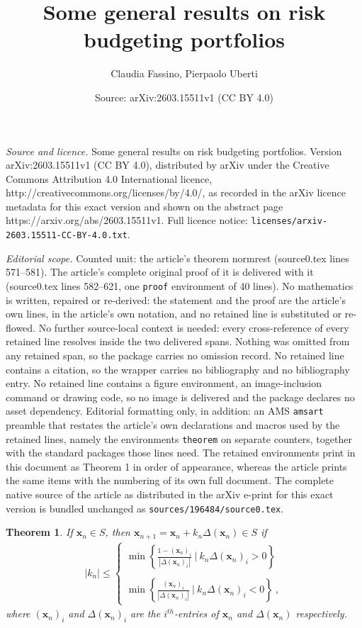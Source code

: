 \documentclass[10pt,a4paper]{amsart}
\title{Some general results on risk budgeting portfolios}
\author{Claudia Fassino, Pierpaolo Uberti}
\date{Source: arXiv:2603.15511v1 (CC BY 4.0)}
\newtheorem{theorem}{Theorem}
\begin{document}
\maketitle

\noindent\emph{Source and licence.} Some general results on risk budgeting portfolios. Version arXiv:2603.15511v1 (CC BY 4.0), distributed by arXiv under the Creative Commons Attribution 4.0 International licence, http://creativecommons.org/licenses/by/4.0/, as recorded in the arXiv licence metadata for this exact version and shown on the abstract page https://arxiv.org/abs/2603.15511v1. Full licence notice: \texttt{licenses/arxiv-2603.15511-CC-BY-4.0.txt}.\par\smallskip

\noindent\textit{Editorial scope.} Counted unit: the article's theorem normrest (source0.tex lines 571--581). The article's complete original proof of it is delivered with it (source0.tex lines 582--621, one \texttt{proof} environment of 40 lines). No mathematics is written, repaired or re-derived: the statement and the proof are the article's own lines, in the article's own notation, and no retained line is substituted or re-flowed.  No further source-local context is needed: every cross-reference of every retained line resolves inside the two delivered spans.  Nothing was omitted from any retained span, so the package carries no omission record.  No retained line contains a citation, so the wrapper carries no bibliography and no bibliography entry.  No retained line contains a figure environment, an image-inclusion command or drawing code, so no image is delivered and the package declares no asset dependency.  Editorial formatting only, in addition: an AMS \texttt{amsart} preamble that restates the article's own declarations and macros used by the retained lines, namely the environments \texttt{theorem} on separate counters, together with the standard packages those lines need.  The retained environments print in this document as Theorem 1 in order of appearance, whereas the article prints the same items with the numbering of its own full document.  The complete native source of the article as distributed in the arXiv e-print for this exact version is bundled unchanged as \texttt{sources/196484/source0.tex}.
\begin{theorem}\label{normrest}
If $\mathbf{x}_n \in S$, then $\mathbf{x}_{n+1}=\mathbf{x}_n+k_n\Delta(\mathbf{x}_n) \in S$ if 
\begin{eqnarray*}
|k_n| \le \left\{\begin{array}{l} \min \left \{ \frac{1-(\mathbf{x}_n)_i}{ |\Delta(\mathbf{x}_n)_i | }  \ | \ k_n\Delta(\mathbf{x}_n)_i >0  \right  \} \\ \\
 \min \left \{ \frac{(\mathbf{x}_n)_i}{ |\Delta(\mathbf{x}_n)_i| }  \ | \ k_n\Delta(\mathbf{x}_n)_i <0  \right  \} \ ,
\end{array}
\right.
\end{eqnarray*}
where $(\mathbf{x}_n)_i$ and $\Delta(\mathbf{x}_n)_i$ are the $i^{th}$-entries of $\mathbf{x}_n$ and $\Delta(\mathbf{x}_n)$ respectively.
\end{theorem}
\end{document}
